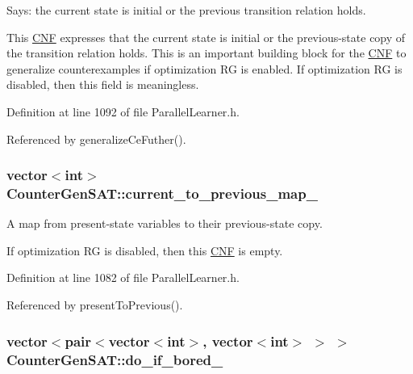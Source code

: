 Says\-: the current state is initial or the previous transition relation holds. 

This \hyperlink{classCNF}{C\-N\-F} expresses that the current state is initial or the previous-\/state copy of the transition relation holds. This is an important building block for the \hyperlink{classCNF}{C\-N\-F} to generalize counterexamples if optimization R\-G is enabled. If optimization R\-G is disabled, then this field is meaningless. 

Definition at line 1092 of file Parallel\-Learner.\-h.



Referenced by generalize\-Ce\-Futher().

\hypertarget{classCounterGenSAT_acdb06a8e09c3c017dbda36d37fab5998}{
\subsubsection[{current\-\_\-to\-\_\-previous\-\_\-map\-\_\-}]{\setlength{\rightskip}{0pt plus 5cm}vector$<$int$>$ Counter\-Gen\-S\-A\-T\-::current\-\_\-to\-\_\-previous\-\_\-map\-\_\-\hspace{0.3cm}{\ttfamily [protected]}}}\label{classCounterGenSAT_acdb06a8e09c3c017dbda36d37fab5998}


A map from present-\/state variables to their previous-\/state copy. 

If optimization R\-G is disabled, then this \hyperlink{classCNF}{C\-N\-F} is empty. 

Definition at line 1082 of file Parallel\-Learner.\-h.



Referenced by present\-To\-Previous().

\hypertarget{classCounterGenSAT_ae4f7bf80b40a44580fde913f300ac4c1}{
\subsubsection[{do\-\_\-if\-\_\-bored\-\_\-}]{\setlength{\rightskip}{0pt plus 5cm}vector$<$pair$<$vector$<$int$>$, vector$<$int$>$ $>$ $>$ Counter\-Gen\-S\-A\-T\-::do\-\_\-if\-\_\-bored\-\_\-\hspace{0.3cm}{\ttfamily [protected]}}}\label{classCounterGenSAT_ae4f7bf80b40a44580fde913f300ac4c1}


